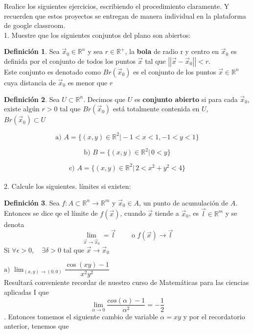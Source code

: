 \documentclass[letterpaper]{article}
\providecommand{\norm}[1]{\left|\left|#1\right|\right|}
\newcommand{\R}{\mathds{R}}
\renewcommand{\*}{\cdot}
\theoremstyle{definition}
\newtheorem{definition}{Definición}
\begin{document}
\noindent Realice los siguientes ejercicios, escribiendo el procedimiento claramente. Y recuerden que estos proyectos se entregan de manera individual en la plataforma de google classroom. \\[0.5cm]
1.  Muestre que los siguientes conjuntos del plano son abiertos: 
\begin{definition}
	Sea $ \vec{x}_0  \in \R^n$  y sea $ r \in \R^+ $, la \textbf{bola} de radio r y centro en $ \vec{x}_0 $ es definida por el conjunto de todos los puntos $ \vec{x} $ tal que $ \norm{\vec{x} - \vec{x}_0} < r $.\\ Este conjunto es denotado como $ Br(\vec{x}_0) $ es el conjunto de los puntos $ \vec{x} \in \R^n $ cuya distancia de $ \vec{x}_0 $ es menor que $ r $
\end{definition}

\begin{definition}
	Sea $ U \subset \R^n $. Decimos que $ U $ es \textbf{conjunto abierto} si para cada $ \vec{x}_0 $, existe algún $ r>0 $ tal que $ Br(\vec{x}_0) $ está totalmente contenida en $ U $, $ Br(\vec{x}_0) \subset U $

\end{definition}

$$\text{a) } A = \{ (x,y) \in \mathbb{R}^2 \vert - 1 < x < 1, - 1 < y < 1 \}$$

$$\text{b) }B = \{ (x,y) \in \mathbb{R}^2 \vert \,  0 < y  \}$$

$$\text{c) }A = \{ (x,y) \in \mathbb{R}^2 \vert \, 2 < x^2  + y^2 <  4 \}$$\\[0.5cm]
2.  Calcule los siguientes. límites si existen: 
\begin{definition}
	Sea $ f: A \subset \R^n \to \R^m $ y $ \vec{x}_0 \in A $, un punto de acumulación de $ A $. Entonces se dice qe el límite de $  f(\vec{x}) $, cuando $ \vec{x} $ tiende a $ \vec{x}_0 $, es $ \vec{\textit{l}} \in \R^m $ y se denota
	\[ \lim\limits_{\vec{x} \to \vec{x}_0} = \vec{\textit{l}} \qquad \text{ o } f(\vec{x}) \to \vec{\textit{l}} \]
	Si $ \forall \epsilon > 0, \quad \exists  \delta > 0 $ tal que $ \vec{x} \to \vec{x}_0 $
\end{definition}


\noindent$\text{a) }\displaystyle\lim_{(x,y) \to (0,0)} \dfrac{\cos(xy) - 1}{x^2y^2}$\\
Resultará conveniente recordar de nuestro curso de Matemáticas para las ciencias aplicadas I que $$ \lim\limits_{\alpha \to 0} \dfrac{cos(\alpha) - 1}{\alpha^2} = -\dfrac{1}{2} $$.  
Entonces tomemos el siguiente cambio de variable $ \alpha = xy $
y por el recordatorio anterior, tenemos que 
 
\end{document}
